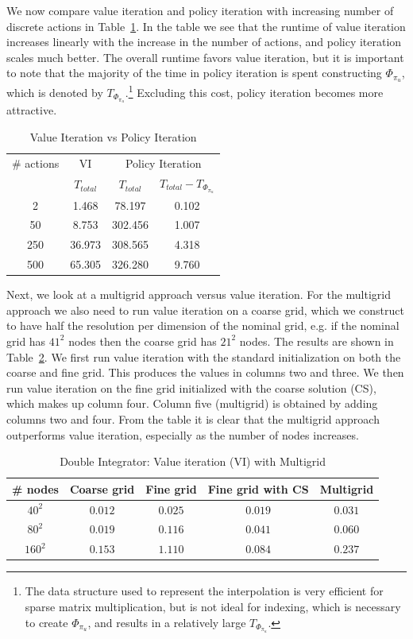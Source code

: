 We now compare value iteration and policy iteration with increasing number of discrete actions in Table~\ref{tab:v_vs_p}. In the table we see that the runtime of value iteration increases linearly with the increase in the number of actions, and policy iteration scales much better. The overall runtime favors value iteration, but it is important to note that the majority of the time in policy iteration is spent constructing $\Phi_{\pi_u}$, which is denoted by $T_{\Phi_{\pi_u}}$.\footnote{The data structure used to represent the interpolation is very efficient for sparse matrix multiplication, but is not ideal for indexing, which is necessary to create $\Phi_{\pi_u}$, and results in a relatively large $T_{\Phi_{\pi_u}}$.} Excluding this cost, policy iteration becomes more attractive.

\begin{table}
\centering
\caption{Value Iteration vs Policy Iteration}
\label{tab:v_vs_p}
\begin{tabular}{|c| c| c| c|}
\hline
\# actions & VI & \multicolumn{2}{|c|}{Policy Iteration} \\ \cline{3-4}
 &  $T_{total} $ & $T_{total}$ & $T_{total} - T_{\Phi_{\pi_u}}$ \\ \hline
2 & 1.468  & 78.197  & 0.102 \\ \hline
50 &  8.753 &  302.456 & 1.007 \\ \hline
250 & 36.973 &  308.565 & 4.318 \\ \hline
500 & 65.305 &  326.280 & 9.760\\
\hline
\end{tabular}
\end{table}

Next, we look at a multigrid approach versus value iteration. For the multigrid approach we also need to run value iteration on a coarse grid, which we construct to have half the resolution per dimension of the nominal grid, e.g. if the nominal grid has $41^2$ nodes then the coarse grid has $21^2$ nodes. The results are shown in Table~\ref{tab:multigrid_di}. We first run value iteration with the standard initialization on both the coarse and fine grid. This produces the values in columns two and three. We then run value iteration on the fine grid initialized with the coarse solution (CS), which makes up column four. Column five (multigrid) is obtained by adding columns two and four. From the table it is clear that the multigrid approach outperforms value iteration, especially as the number of nodes increases.

\begin{table}
\centering
\caption{Double Integrator: Value iteration (VI) with Multigrid}
\label{tab:multigrid_di}
\begin{tabular}{|c| c| c| c| c| }
\hline
\# nodes & Coarse grid & Fine grid &  Fine grid with CS & Multigrid \\ \hline
$40^2$ & $0.012$ & $0.025$ & $0.019$ & $0.031$ \\ \hline
$80^2$ & $0.019$ & $0.116$ & $0.041$ & $0.060$\\ \hline
$160^2$ & $0.153$ & $1.110$ & $0.084$ & $0.237$\\ \hline
\end{tabular}
\end{table}

